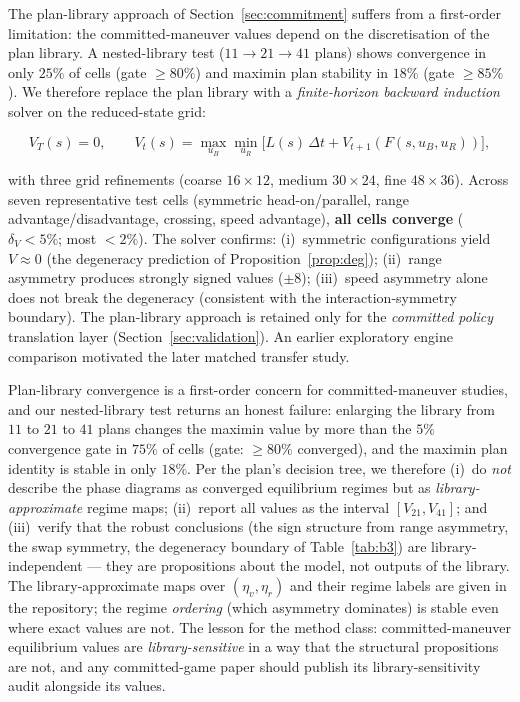 \documentclass[12pt,a4paper]{article}
\newcommand{\etav}{\eta_v}
\newcommand{\etar}{\eta_r}
\begin{document}
The plan-library approach of Section~\ref{sec:commitment} suffers from a
first-order limitation: the committed-maneuver values depend on the
discretisation of the plan library.  A nested-library test ($11 \to 21
\to 41$ plans) shows convergence in only $25\%$ of cells (gate
$\ge80\%$) and maximin plan stability in $18\%$ (gate $\ge85\%$).  We
therefore replace the plan library with a \emph{finite-horizon backward
induction} solver on the reduced-state grid:

\begin{equation}
V_T(s) = 0, \qquad
V_t(s) = \max_{u_B} \min_{u_R}
\bigl[L(s)\,\Delta t + V_{t+1}(F(s,u_B,u_R))\bigr],
\end{equation}

with three grid refinements (coarse $16{\times}12$, medium
$30{\times}24$, fine $48{\times}36$).  Across seven representative test
cells (symmetric head-on/parallel, range advantage/disadvantage,
crossing, speed advantage), \textbf{all cells converge} ($\delta_V < 5\%$;
most $< 2\%$).  The solver confirms:
(i)~symmetric configurations yield $V \approx 0$ (the degeneracy
prediction of Proposition~\ref{prop:deg});
(ii)~range asymmetry produces strongly signed values ($\pm 8$);
(iii)~speed asymmetry alone does not break the degeneracy (consistent
with the interaction-symmetry boundary).
The plan-library approach is retained only for the \emph{committed
policy} translation layer (Section~\ref{sec:validation}).  An earlier
exploratory engine comparison motivated the later matched transfer study.

Plan-library convergence is a first-order concern for committed-maneuver
studies, and our nested-library test returns an honest failure: enlarging
the library from $11$ to $21$ to $41$ plans changes the maximin value by
more than the $5\%$ convergence gate in $75\%$ of cells (gate: $\ge80\%$
converged), and the maximin plan identity is stable in only $18\%$.
Per the plan's decision tree, we therefore (i)~do \emph{not} describe the
phase diagrams as converged equilibrium regimes but as
\emph{library-approximate} regime maps; (ii)~report all values as the
interval $[V_{21},V_{41}]$; and (iii)~verify that the robust conclusions
(the sign structure from range asymmetry, the swap symmetry, the
degeneracy boundary of Table~\ref{tab:b3}) are library-independent ---
they are propositions about the model, not outputs of the library.  The
library-approximate maps over $(\etav,\etar)$ and their regime labels are
given in the repository; the regime \emph{ordering} (which asymmetry
dominates) is stable even where exact values are not.  The lesson for the
method class: committed-maneuver equilibrium values are
\emph{library-sensitive} in a way that the structural propositions are
not, and any committed-game paper should publish its library-sensitivity
audit alongside its values.
\end{document}
